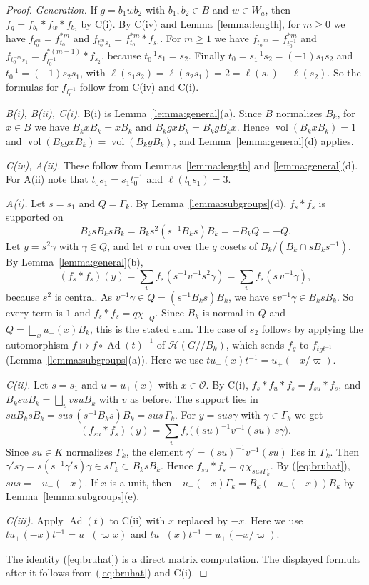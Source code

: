 \documentclass[12pt,letterpaper]{amsart}
\numberwithin{equation}{section}
\theoremstyle{definition}
\theoremstyle{remark}
\DeclareMathOperator{\vol}{vol}
\DeclareMathOperator{\Ad}{Ad}
\newcommand{\cO}{\mathcal{O}}
\newcommand{\cH}{\mathcal{H}}
\newcommand{\Hlin}{\cH(G/\!/B_k)}
\begin{document}
\begin{proof}
\emph{Generation.} If $g=b_1wb_2$ with $b_1,b_2\in B$ and $w\in W_a$,
then $f_g=f_{b_1}*f_w*f_{b_2}$ by C(i). By C(iv) and
Lemma~\ref{lemma:length}, for $m\geq 0$ we have
$f_{t_0^m}=f_{t_0}^{*m}$ and $f_{t_0^ms_1}=f_{t_0}^{*m}*f_{s_1}$. For
$m\geq 1$ we have $f_{t_0^{-m}}=f_{t_0^{-1}}^{*m}$ and
$f_{t_0^{-m}s_1}=f_{t_0^{-1}}^{*(m-1)}*f_{s_2}$, because
$t_0^{-1}s_1=s_2$. Finally $t_0=s_1^{-1}s_2=(-1)s_1s_2$ and
$t_0^{-1}=(-1)s_2s_1$, with
$\ell(s_1s_2)=\ell(s_2s_1)=2=\ell(s_1)+\ell(s_2)$. So the formulas for
$f_{t_0^{\pm1}}$ follow from C(iv) and C(i).

\emph{\textup{B(i), B(ii), C(i)}.} B(i) is
Lemma~\ref{lemma:general}(a). Since $B$ normalizes $B_k$, for $x\in B$
we have $B_kxB_k=xB_k$ and $B_kgxB_k=B_kgB_kx$. Hence
$\vol(B_kxB_k)=1$ and $\vol(B_kgxB_k)=\vol(B_kgB_k)$, and
Lemma~\ref{lemma:general}(d) applies.

\emph{\textup{C(iv), A(ii)}.} These follow from
Lemmas~\ref{lemma:length} and \ref{lemma:general}(d). For A(ii) note
that $t_0s_1=s_1t_0^{-1}$ and $\ell(t_0s_1)=3$.

\emph{\textup{A(i)}.} Let $s=s_1$ and $Q=\Gamma_k$. By
Lemma~\ref{lemma:subgroups}(d), $f_s*f_s$ is supported on
\[
B_ksB_ksB_k=B_ks^2(s^{-1}B_ks)B_k=-B_kQ=-Q.
\]
Let $y=s^2\gamma$ with $\gamma\in Q$, and let $v$ run over the $q$
cosets of $B_k/(B_k\cap sB_ks^{-1})$. By
Lemma~\ref{lemma:general}(b),
\[
(f_s*f_s)(y)=\sum_v f_s(s^{-1}v^{-1}s^2\gamma)
=\sum_v f_s(s\,v^{-1}\gamma),
\]
because $s^2$ is central. As $v^{-1}\gamma\in Q=(s^{-1}B_ks)B_k$, we
have $sv^{-1}\gamma\in B_ksB_k$. So every term is $1$ and
$f_s*f_s=q\chi_{-Q}$. Since $B_k$ is normal in $Q$ and
$Q=\bigsqcup_x u_-(x)B_k$, this is the stated sum. The case of $s_2$
follows by applying the automorphism $f\mapsto f\circ\Ad(t)^{-1}$ of
$\Hlin$, which sends $f_g$ to $f_{tgt^{-1}}$
(Lemma~\ref{lemma:subgroups}(a)). Here we use
$tu_-(x)t^{-1}=u_+(-x/\varpi)$.

\emph{\textup{C(ii)}.} Let $s=s_1$ and $u=u_+(x)$ with $x\in\cO$. By
C(i), $f_s*f_u*f_s=f_{su}*f_s$, and $B_ksuB_k=\bigsqcup_v vsuB_k$ with
$v$ as before. The support lies in
$suB_ksB_k=sus\,(s^{-1}B_ks)B_k=sus\,\Gamma_k$. For
$y=sus\gamma$ with $\gamma\in\Gamma_k$ we get
\[
(f_{su}*f_s)(y)=\sum_vf_s\bigl((su)^{-1}v^{-1}(su)\,s\gamma\bigr).
\]
Since $su\in K$ normalizes $\Gamma_k$, the element
$\gamma'=(su)^{-1}v^{-1}(su)$ lies in $\Gamma_k$. Then
$\gamma's\gamma=s(s^{-1}\gamma's)\gamma\in s\Gamma_k\subset B_ksB_k$.
Hence $f_{su}*f_s=q\,\chi_{sus\Gamma_k}$. By (\ref{eq:bruhat}),
$sus=-u_-(-x)$. If $x$ is a unit, then
$-u_-(-x)\Gamma_k=B_k(-u_-(-x))B_k$ by
Lemma~\ref{lemma:subgroups}(e).

\emph{\textup{C(iii)}.} Apply $\Ad(t)$ to C(ii) with $x$ replaced by
$-x$. Here we use $tu_+(-x)t^{-1}=u_-(\varpi x)$ and
$tu_-(x)t^{-1}=u_+(-x/\varpi)$.

The identity (\ref{eq:bruhat}) is a direct matrix computation. The
displayed formula after it follows from (\ref{eq:bruhat}) and C(i).
\end{proof}
\end{document}
